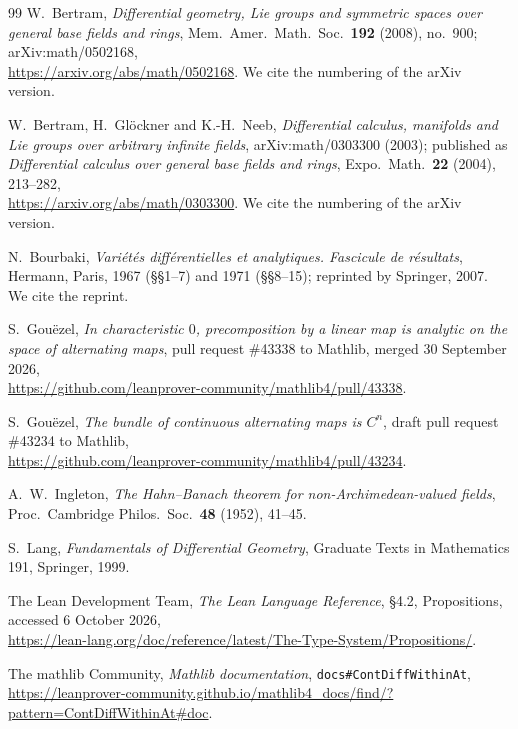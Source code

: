 \documentclass[11pt]{amsart}
\theoremstyle{definition}
\theoremstyle{remark}
\numberwithin{equation}{section}
\begin{document}
\begin{thebibliography}{99}
 W.~Bertram, \emph{Differential geometry, Lie groups and symmetric spaces over general base fields and rings},
Mem.\ Amer.\ Math.\ Soc.\ \textbf{192} (2008), no.~900; arXiv:math/0502168,\\
{\small\url{https://arxiv.org/abs/math/0502168}}. We cite the numbering of the arXiv version.

 W.~Bertram, H.~Gl\"ockner and K.-H.~Neeb,
\emph{Differential calculus, manifolds and Lie groups over arbitrary infinite fields},
arXiv:math/0303300 (2003); published as \emph{Differential calculus over general base fields and rings}, Expo.\ Math.\ \textbf{22} (2004), 213--282,\\
{\small\url{https://arxiv.org/abs/math/0303300}}. We cite the numbering of the arXiv version.

 N.~Bourbaki, \emph{Vari\'et\'es diff\'erentielles et analytiques. Fascicule de r\'esultats}, Hermann, Paris,
1967 (\S\S1--7) and 1971 (\S\S8--15); reprinted by Springer, 2007. We cite the reprint.

 S.~Gou\"ezel, \emph{In characteristic $0$, precomposition by a linear map is analytic on the space of
alternating maps}, pull request \#43338 to Mathlib, merged 30 September 2026,\\ {\small\url{https://github.com/leanprover-community/mathlib4/pull/43338}}.

 S.~Gou\"ezel, \emph{The bundle of continuous alternating maps is $C^n$}, draft pull request \#43234 to Mathlib,\\
{\small\url{https://github.com/leanprover-community/mathlib4/pull/43234}}.

 A.~W.~Ingleton, \emph{The Hahn--Banach theorem for non-Archimedean-valued fields}, Proc.\ Cambridge Philos.\
Soc.\ \textbf{48} (1952), 41--45.

 S.~Lang, \emph{Fundamentals of Differential Geometry}, Graduate Texts in Mathematics 191, Springer, 1999.

 The Lean Development Team, \emph{The Lean Language Reference},
\S4.2, Propositions, accessed 6 October 2026,\\
{\small\url{https://lean-lang.org/doc/reference/latest/The-Type-System/Propositions/}}.

 The mathlib Community, \emph{Mathlib documentation}, \texttt{docs\#ContDiffWithinAt},\\
{\footnotesize\url{https://leanprover-community.github.io/mathlib4_docs/find/?pattern=ContDiffWithinAt#doc}}.


\end{thebibliography}
\end{document}
